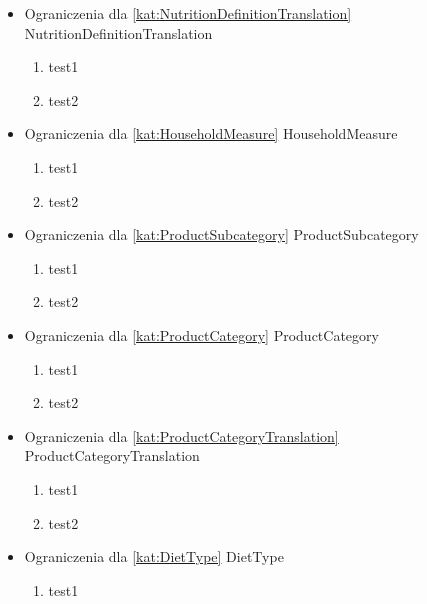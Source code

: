 \begin{itemize}[label={}]
\begin{enumerate}[label={\textbf{OGR/\protect\threedigits{\arabic{enumi}}}}, wide, labelwidth=!, resume]
    \end{enumerate}
    \item Ograniczenia dla \ref{kat:NutritionDefinitionTranslation} NutritionDefinitionTranslation
    \begin{enumerate}[label={\textbf{OGR/\protect\threedigits{\arabic{enumi}}}}, wide, labelwidth=!, resume]
        \item test1
        \item test2
    \end{enumerate}
    \item Ograniczenia dla \ref{kat:HouseholdMeasure} HouseholdMeasure
    \begin{enumerate}[label={\textbf{OGR/\protect\threedigits{\arabic{enumi}}}}, wide, labelwidth=!, resume]
        \item test1
        \item test2
    \end{enumerate}
    \item Ograniczenia dla \ref{kat:ProductSubcategory} ProductSubcategory
    \begin{enumerate}[label={\textbf{OGR/\protect\threedigits{\arabic{enumi}}}}, wide, labelwidth=!, resume]
        \item test1
        \item test2
    \end{enumerate}
    \item Ograniczenia dla \ref{kat:ProductCategory} ProductCategory
    \begin{enumerate}[label={\textbf{OGR/\protect\threedigits{\arabic{enumi}}}}, wide, labelwidth=!, resume]
        \item test1
        \item test2
    \end{enumerate}
    \item Ograniczenia dla \ref{kat:ProductCategoryTranslation} ProductCategoryTranslation
    \begin{enumerate}[label={\textbf{OGR/\protect\threedigits{\arabic{enumi}}}}, wide, labelwidth=!, resume]
        \item test1
        \item test2
    \end{enumerate}
    \item Ograniczenia dla \ref{kat:DietType} DietType
    \begin{enumerate}[label={\textbf{OGR/\protect\threedigits{\arabic{enumi}}}}, wide, labelwidth=!, resume]
        \item test1

\end{enumerate}
\end{itemize}
